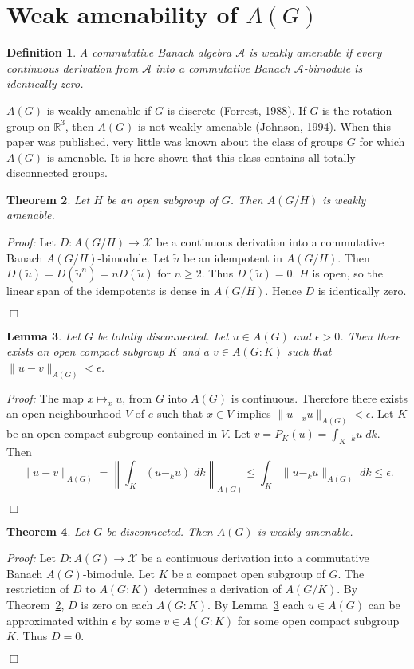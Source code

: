 \documentclass[12 pt]{article}
\newcommand\done{\begin{flushright}$\Box$\end{flushright}}
\newtheorem{defn}{Definition}
\newtheorem{theorem}[defn]{Theorem}
\newtheorem{lemma}[defn]{Lemma}
\begin{document}
\section{Weak amenability of $A(G)$}

\begin{defn}
A commutative Banach algebra $\mathcal{A}$ is weakly amenable if every continuous derivation
from $\mathcal{A}$ into a commutative Banach $\mathcal{A}$-bimodule is identically zero.
\end{defn}

$A(G)$ is weakly amenable if $G$ is discrete (Forrest, 1988).  If $G$ is the rotation group
on ${\mathbb R}^3$, then $A(G)$ is not weakly amenable (Johnson, 1994).
When this paper was published, very little was known about the class of groups
$G$ for which $A(G)$ is amenable.  It is here shown that this class contains all totally disconnected
groups.


\begin{theorem}\label{5.1}
Let $H$ be an open subgroup of $G$.  Then $A(G/H)$ is weakly amenable.
\end{theorem}
{\it Proof:}  Let $D: A(G/H) \rightarrow \mathcal{X}$ be a continuous derivation into a 
commutative Banach $A(G/H)$-bimodule.  Let $\tilde{u}$ be an idempotent in $A(G/H)$.
Then $D(\tilde{u}) = D(\tilde{u}^n) = nD(\tilde{u})$ for $n\geq 2$.  Thus $D(\tilde{u}) = 0$.
$H$ is open, so the linear span of the idempotents is dense in $A(G/H)$.  Hence $D$ is
identically zero.
\done

\begin{lemma}\label{5.2}
Let $G$ be totally disconnected.  Let $u\in A(G)$ and $\epsilon > 0$.  Then there
exists an open compact subgroup $K$ and a $v\in A(G:K)$ such that $\|u-v\|_{A(G)} < \epsilon$.
\end{lemma}
{\it Proof:}  The map $x \mapsto _{x}\!u$, from $G$ into $A(G)$ is continuous.  Therefore
there exists an open neighbourhood $V$ of $e$ such that $x\in V$ implies
$\|u-  _{x}u\|_{A(G)} < \epsilon$.  Let $K$ be an open compact subgroup contained in $V$.
Let $v = P_K (u) = \int_{K}\;_k u\;dk$.  Then
$$
\|u-v\|_{A(G)} = \left\|\int_K (u- _{k}\!u)\;dk\right\|_{A(G)} \leq \int_K \|u - _{k}\!u\|_{A(G)}\;dk
\leq \epsilon.
$$
\done

\begin{theorem}\label{5.3}
Let $G$ be disconnected.  Then $A(G)$ is weakly amenable.
\end{theorem}
{\it Proof:}  Let $D: A(G) \rightarrow \mathcal{X}$ be a continuous derivation into a 
commutative Banach $A(G)$-bimodule.  Let $K$ be a compact open subgroup of $G$.  The
restriction of $D$ to $A(G:K)$ determines a derivation of $A(G/K)$.  By Theorem~\ref{5.1},
$D$ is zero on each $A(G:K)$.  By Lemma~\ref{5.2} each $u\in A(G)$ can be approximated
within $\epsilon$ by some $v\in A(G:K)$ for some open compact subgroup $K$.  Thus $D=0$.
\done
\end{document}
